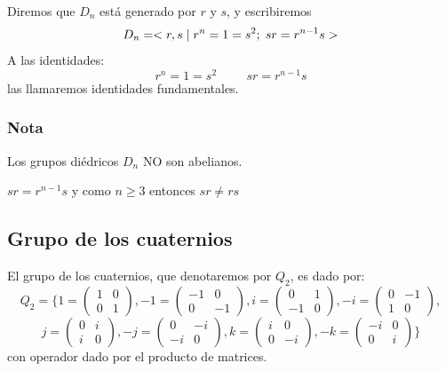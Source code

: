 \documentclass[11pt,a4paper]{article}
\begin{document}
Diremos que $D_{n}$ está generado por $r$ y $s$, y escribiremos
$$D_{n} = <r,s \hspace{0.1cm} | \hspace{0.1cm} r^{n}=1=s^{2}; \hspace{0.1cm} sr = r^{n-1}s>$$
A las identidades:
$$r^{n} = 1 = s^{2} \hspace{1cm} sr = r^{n-1}s$$
las llamaremos identidades fundamentales.

\subsubsection*{Nota}

Los grupos diédricos $D_{n}$ NO son abelianos.

$sr = r^{n-1}s$ y como $n \geq 3$ entonces $sr \neq rs$

\subsection{Grupo de los cuaternios}

El grupo de los cuaternios, que denotaremos por $Q_{2}$, es dado por:
\begin{equation*}
Q_{2} = \{ 1 = 
\begin{pmatrix}
1 & 0 \\
0 & 1
\end{pmatrix}
, -1 = 
\begin{pmatrix}
-1 & 0 \\
0 & -1
\end{pmatrix}
, i =
\begin{pmatrix}
0 & 1 \\
-1 & 0 
\end{pmatrix}
, -i =
\begin{pmatrix}
0 & -1 \\
1 & 0
\end{pmatrix}
,
\end{equation*}
\begin{equation*}
j =
\begin{pmatrix}
0 & i \\
i & 0
\end{pmatrix}
, -j =
\begin{pmatrix}
0 & -i \\
-i & 0
\end{pmatrix}
, k =
\begin{pmatrix}
i & 0 \\
0 & -i
\end{pmatrix}
, -k =
\begin{pmatrix}
-i & 0 \\
0 & i
\end{pmatrix}
\}
\end{equation*}
con operador dado por el producto de matrices.
\end{document}
